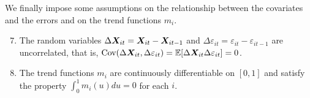 \documentclass[a4paper,12pt]{article}
\begin{document}
We finally impose some assumptions on the relationship between the covariates and the errors and on the trend functions $m_i$.
\begin{enumerate}[label=(C\arabic*),leftmargin=1.05cm]
\setcounter{enumi}{6}
\item \label{C-reg-err} The random variables $\Delta \boldsymbol{X}_{it} = \boldsymbol{X}_{it} - \boldsymbol{X}_{it-1}$ and $\Delta \varepsilon_{it} = \varepsilon_{it} - \varepsilon_{it-1}$ are uncorrelated, that is, $\textnormal{Cov}(\Delta \boldsymbol{X}_{it}, \Delta \varepsilon_{it}) = \mathbb{E}[\Delta \boldsymbol{X}_{it} \Delta \varepsilon_{it}] = 0$. 
\item \label{C-trend} The trend functions $m_i$ are continuously differentiable on $[0, 1]$ and satisfy the property $\int_0^1m_i (u)du = 0$ for each $i$.
\end{enumerate}
\end{document}
